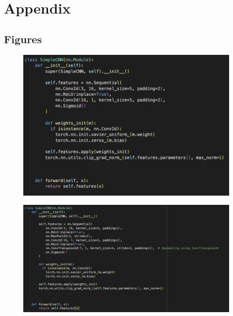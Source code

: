 \documentclass[a4paper,12pt]{extarticle}
\begin{document}
\newpage
\appendix
\section{Appendix}
\subsection{Figures}


\begin{figure}[H]
    \centering
    \includegraphics[width=\linewidth]{CNN simple model.png}
    \label{fig:simple-CNN}
\end{figure}

\begin{figure}[H]
    \centering
    \includegraphics[width=\linewidth]{CNN model pooling.png}
    \label{fig:pooling-CNN}
\end{figure}
\end{document}
